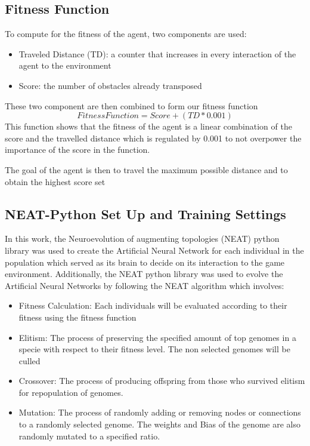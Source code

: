 \documentclass[journal]{IEEEtran}
\begin{document}
\subsection{Fitness Function}
To compute for the fitness of the agent, two components are used:
\begin{itemize}
\item Traveled Distance (TD): a counter that increases in every interaction of the agent to the environment
\item Score: the number of obstacles already transposed
\end{itemize}

These two component are then combined to form our fitness function
$$
 FitnessFunction = Score + (TD*0.001) 
$$
This function shows that the fitness of the agent is a linear combination of the score and the travelled distance which is regulated by 0.001 to not overpower the importance of the score in the function.

The goal of the agent is then to travel the
maximum possible distance and to obtain the highest score set

\subsection{NEAT-Python Set Up and Training Settings}

In this work, the Neuroevolution of augmenting topologies (NEAT) python library was used to create the Artificial Neural Network for each individual in the population which served as its brain to decide on its interaction to the game environment. Additionally, the NEAT python library was used to evolve the Artificial Neural Networks by following the NEAT algorithm which involves:

\begin{itemize}
\item Fitness Calculation: Each individuals will be evaluated according to their fitness using the fitness function
\item Elitism: The process of preserving the specified amount of top genomes in a specie with respect to their fitness level. The non selected genomes will be culled
\item Crossover: The process of producing offspring from those who survived elitism for repopulation of genomes.
\item Mutation: The process of randomly adding or removing nodes or connections to a randomly selected genome. The weights and Bias of the genome are also randomly mutated to a specified ratio.
\end{itemize}
\end{document}
